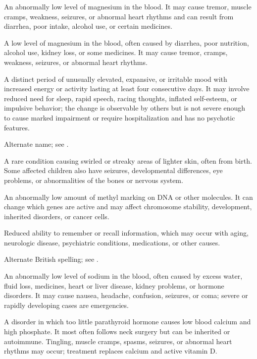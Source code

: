  An abnormally low level of magnesium in the blood. It may cause tremor, muscle cramps, weakness, seizures, or abnormal heart rhythms and can result from diarrhea, poor intake, alcohol use, or certain medicines.

 A low level of magnesium in the blood, often caused by diarrhea, poor nutrition, alcohol use, kidney loss, or some medicines. It may cause tremor, cramps, weakness, seizures, or abnormal heart rhythms.

 A distinct period of unusually elevated, expansive, or irritable mood with increased energy or activity lasting at least four consecutive days. It may involve reduced need for sleep, rapid speech, racing thoughts, inflated self-esteem, or impulsive behavior; the change is observable by others but is not severe enough to cause marked impairment or require hospitalization and has no psychotic features.

 Alternate name; see .

 A rare condition causing swirled or streaky areas of lighter skin, often from birth. Some affected children also have seizures, developmental differences, eye problems, or abnormalities of the bones or nervous system.

 An abnormally low amount of methyl marking on DNA or other molecules. It can change which genes are active and may affect chromosome stability, development, inherited disorders, or cancer cells.

 Reduced ability to remember or recall information, which may occur with aging, neurologic disease, psychiatric conditions, medications, or other causes.

 Alternate British spelling; see .

 An abnormally low level of sodium in the blood, often caused by excess water, fluid loss, medicines, heart or liver disease, kidney problems, or hormone disorders. It may cause nausea, headache, confusion, seizures, or coma; severe or rapidly developing cases are emergencies.

 A disorder in which too little parathyroid hormone causes low blood calcium and high phosphate. It most often follows neck surgery but can be inherited or autoimmune. Tingling, muscle cramps, spasms, seizures, or abnormal heart rhythms may occur; treatment replaces calcium and active vitamin D.

